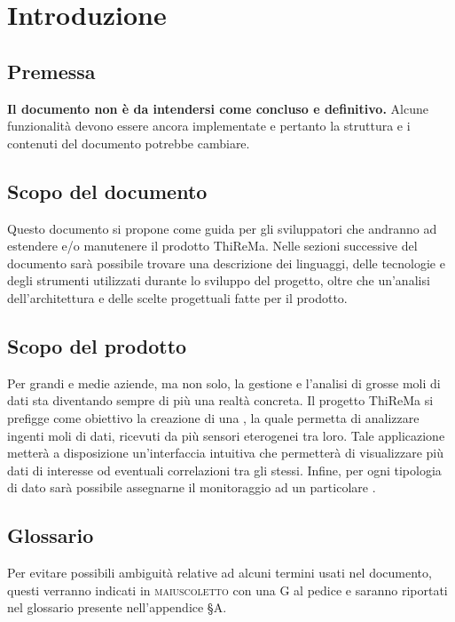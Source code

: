 \section{Introduzione}
	\subsection{Premessa}
		\textbf{Il documento non è da intendersi come concluso e definitivo.} Alcune funzionalità devono essere ancora implementate e pertanto la struttura e i contenuti del documento potrebbe cambiare.
	\subsection{Scopo del documento}
		Questo documento si propone come guida per gli sviluppatori che andranno ad estendere e/o manutenere il prodotto ThiReMa. 
		\newline
		Nelle sezioni successive del documento sarà possibile trovare una descrizione dei linguaggi, delle tecnologie e degli strumenti utilizzati durante lo sviluppo del progetto, oltre che un'analisi dell'architettura e delle scelte progettuali fatte per il prodotto.
	\subsection{Scopo del prodotto}
	 	Per grandi e medie aziende, ma non solo, la gestione e l'analisi di grosse moli di dati sta diventando sempre di più una realtà concreta.
	 	\newline
		Il progetto ThiReMa si prefigge come obiettivo la creazione di una , la quale permetta di analizzare ingenti moli di dati, ricevuti da più sensori eterogenei tra loro. Tale applicazione metterà a disposizione un'interfaccia intuitiva che permetterà di visualizzare più dati di interesse od eventuali correlazioni tra gli stessi. Infine, per ogni tipologia di dato sarà possibile assegnarne il monitoraggio ad un particolare .	
	\subsection{Glossario}
		Per evitare possibili ambiguità relative ad alcuni termini usati nel documento, questi verranno indicati in \textsc{maiuscoletto} con una G al pedice e saranno riportati nel glossario presente nell'appendice \S A.
